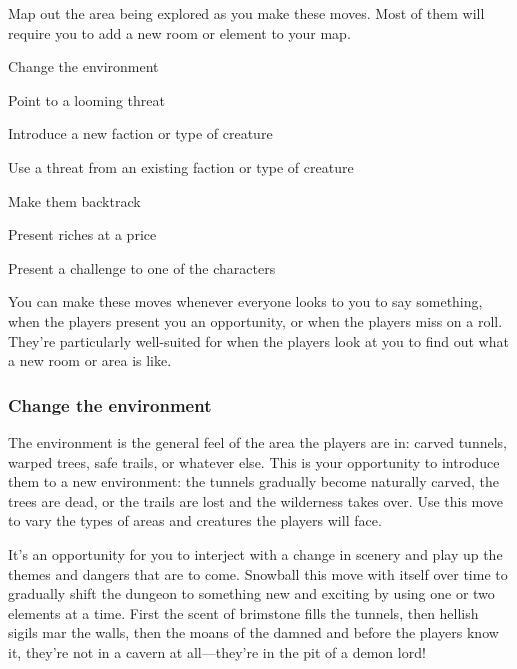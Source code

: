  

Map out the area being explored as you make these moves. Most of them will require you to add a new room or element to your map.

 
\startitemize[1,packed]

\item Change the environment

 
\item Point to a looming threat

 
\item Introduce a new faction or type of creature

 
\item Use a threat from an existing faction or type of creature

 
\item Make them backtrack

 
\item Present riches at a price

 
\item Present a challenge to one of the characters


\stopitemize
 

You can make these moves whenever everyone looks to you to say something, when the players present you an opportunity, or when the players miss on a roll. They're particularly well-suited for when the players look at you to find out what a new room or area is like.

 
\subsubsection{Change the environment}    
 

The environment is the general feel of the area the players are in: carved tunnels, warped trees, safe trails, or whatever else. This is your opportunity to introduce them to a new environment: the tunnels gradually become naturally carved, the trees are dead, or the trails are lost and the wilderness takes over. Use this move to vary the types of areas and creatures the players will face.

  

It's an opportunity for you to interject with a change in scenery and play up the themes and dangers that are to come. Snowball this move with itself over time to gradually shift the dungeon to something new and exciting by using one or two elements at a time. First the scent of brimstone fills the tunnels, then hellish sigils mar the walls, then the moans of the damned and before the players know it, they're not in a cavern at all—they're in the pit of a demon lord!

